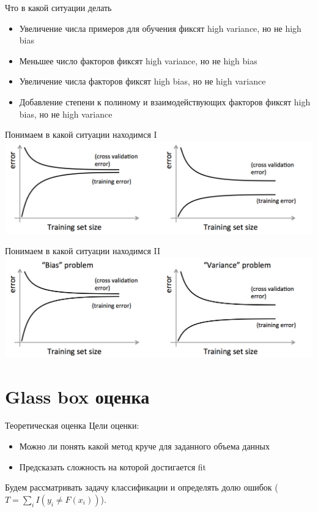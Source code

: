 \documentclass[14pt, fleqn, xcolor={dvipsnames, table}]{beamer}
\begin{document}
\begin{frame}{Что в какой ситуации делать}
\begin{itemize}
  \item Увеличение числа примеров для обучения фиксят high variance, но не high bias
  \item Меньшее число факторов фиксят high variance, но не high bias
  \item Увеличение числа факторов фиксят high bias, но не high variance
  \item Добавление степени к полиному и взаимодействующих факторов фиксят high bias, но не high variance
\end{itemize}
\end{frame}

\begin{frame}{Понимаем в какой ситуации находимся I}
\centering
\includegraphics[width=1.0\textwidth]{bias_error.png}
\end{frame}

\begin{frame}{Понимаем в какой ситуации находимся II}
\centering
\includegraphics[width=1.0\textwidth]{bias_error_2.png}
\end{frame}


\section{Glass box оценка}
\begin{frame}{Теоретическая оценка}
Цели оценки:
\begin{itemize}
  \item Можно ли понять какой метод круче для заданного объема данных
  \item Предсказать сложность на которой достигается fit
\end{itemize}
Будем рассматривать задачу классификации и определять долю ошибок ($T = \sum_i I(y_i \ne F(x_i))$). 
\end{frame}
\end{document}

